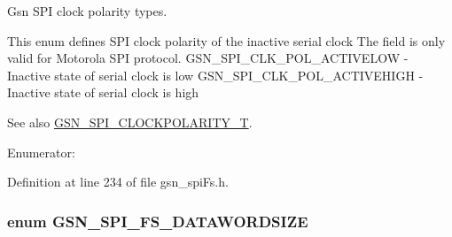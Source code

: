 Gsn SPI clock polarity types. 

This enum defines SPI clock polarity of the inactive serial clock The field is only valid for Motorola SPI protocol. GSN\_\-SPI\_\-CLK\_\-POL\_\-ACTIVELOW -\/ Inactive state of serial clock is low GSN\_\-SPI\_\-CLK\_\-POL\_\-ACTIVEHIGH -\/ Inactive state of serial clock is high

\begin{DoxySeeAlso}{See also}
\hyperlink{a00655_ga40c914db809ec79fd3a564dda8364aea}{GSN\_\-SPI\_\-CLOCKPOLARITY\_\-T}. 
\end{DoxySeeAlso}
\begin{Desc}
\item[Enumerator: ]\par
\begin{description}
\item[{\em 
\hypertarget{a00655_gga5d0a21479bf57ff38c1c967f95ea5e83aabbe13ebea335b5e2423a7eaafe92692}{
GSN\_\-SPI\_\-FS\_\-CLK\_\-POL\_\-INACTIVELOW}
\label{a00655_gga5d0a21479bf57ff38c1c967f95ea5e83aabbe13ebea335b5e2423a7eaafe92692}
}]\item[{\em 
\hypertarget{a00655_gga5d0a21479bf57ff38c1c967f95ea5e83ae452187e9202e738ad42a71388a2ea72}{
GSN\_\-SPI\_\-FS\_\-CLK\_\-POL\_\-INACTIVEHIGH}
\label{a00655_gga5d0a21479bf57ff38c1c967f95ea5e83ae452187e9202e738ad42a71388a2ea72}
}]\end{description}
\end{Desc}



Definition at line 234 of file gsn\_\-spiFs.h.

\hypertarget{a00655_ga14e8640824b36f8fbc046289a0fef146}{
\subsubsection[{GSN\_\-SPI\_\-FS\_\-DATAWORDSIZE}]{\setlength{\rightskip}{0pt plus 5cm}enum {\bf GSN\_\-SPI\_\-FS\_\-DATAWORDSIZE}}}
\label{a00655_ga14e8640824b36f8fbc046289a0fef146}


